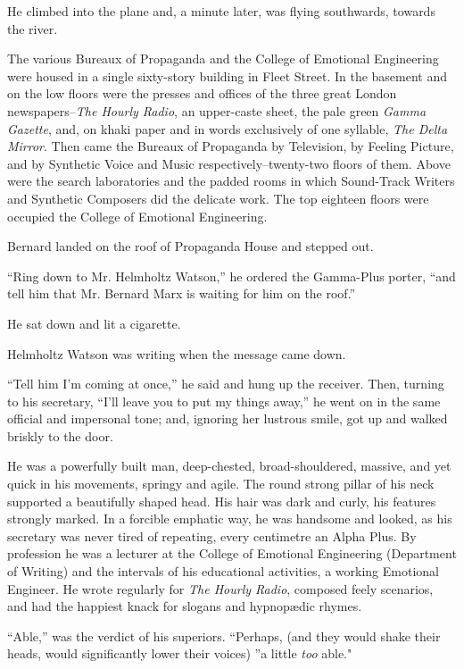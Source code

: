 \documentclass[12pt]{report}
\begin{document}
He climbed into the plane and, a minute later, was flying southwards,
towards the river.

The various Bureaux of Propaganda and the College of Emotional
Engineering were housed in a single sixty-story building in Fleet
Street. In the basement and on the low floors were the presses and
offices of the three great London newspapers--\emph{The Hourly Radio},
an upper-caste sheet, the pale green \emph{Gamma Gazette}, and, on khaki
paper and in words exclusively of one syllable, \emph{The Delta Mirror}.
Then came the Bureaux of Propaganda by Television, by Feeling Picture,
and by Synthetic Voice and Music respectively--twenty-two floors of
them. Above were the search laboratories and the padded rooms in which
Sound-Track Writers and Synthetic Composers did the delicate work. The
top eighteen floors were occupied the College of Emotional Engineering.

Bernard landed on the roof of Propaganda House and stepped out.

``Ring down to Mr. Helmholtz Watson,'' he ordered the Gamma-Plus porter,
``and tell him that Mr. Bernard Marx is waiting for him on the roof.''

He sat down and lit a cigarette.

Helmholtz Watson was writing when the message came down.

``Tell him I'm coming at once,'' he said and hung up the receiver. Then,
turning to his secretary, ``I'll leave you to put my things away,'' he
went on in the same official and impersonal tone; and, ignoring her
lustrous smile, got up and walked briskly to the door.

He was a powerfully built man, deep-chested, broad-shouldered, massive,
and yet quick in his movements, springy and agile. The round strong
pillar of his neck supported a beautifully shaped head. His hair was
dark and curly, his features strongly marked. In a forcible emphatic
way, he was handsome and looked, as his secretary was never tired of
repeating, every centimetre an Alpha Plus. By profession he was a
lecturer at the College of Emotional Engineering (Department of Writing)
and the intervals of his educational activities, a working Emotional
Engineer. He wrote regularly for \emph{The Hourly Radio}, composed feely
scenarios, and had the happiest knack for slogans and hypnopædic rhymes.

``Able,'' was the verdict of his superiors. ``Perhaps, (and they would
shake their heads, would significantly lower their voices) ''a little
\emph{too} able."
\end{document}
